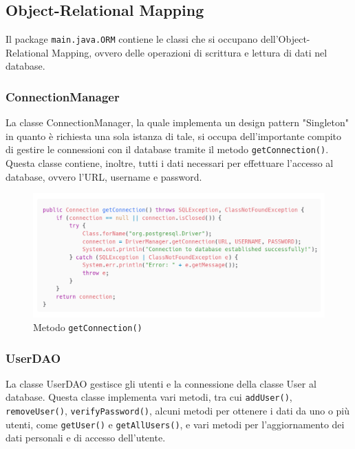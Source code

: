 \documentclass{article}
\begin{document}
\subsection{Object-Relational Mapping}
Il package \texttt{main.java.ORM} contiene le classi che si occupano dell'Object-Relational Mapping, ovvero delle operazioni di scrittura e lettura di dati nel database.

\subsubsection{ConnectionManager}
La classe ConnectionManager, la quale implementa un design pattern "Singleton" in quanto è richiesta una sola istanza di tale, si occupa dell'importante compito di gestire le connessioni con il database tramite il metodo \texttt{getConnection()}. Questa classe contiene, inoltre, tutti i dati necessari per effettuare l'accesso al database, ovvero l'URL, username e password.

\begin{figure}[!h]
    \includegraphics[width=1.0\linewidth]{imgs/snippets/Code_GetConnection.png}
    \caption{Metodo \texttt{getConnection()}}
    \label{code_getConnection}
\end{figure}

\subsubsection{UserDAO}
La classe UserDAO gestisce gli utenti e la connessione della classe User al database. Questa classe implementa vari metodi, tra cui \texttt{addUser()}, \texttt{removeUser()}, \texttt{verifyPassword()}, alcuni metodi per ottenere i dati da uno o più utenti, come \texttt{getUser()} e \texttt{getAllUsers()}, e vari metodi per l'aggiornamento dei dati personali e di accesso dell'utente.
\end{document}
